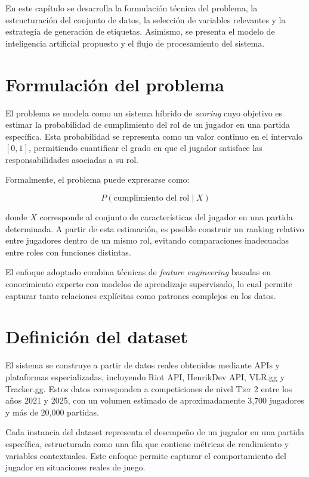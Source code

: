 \documentclass{ULBreport} %
\begin{document}
En este capítulo se desarrolla la formulación técnica del problema, la estructuración del conjunto de datos, la selección de variables relevantes y la estrategia de generación de etiquetas. Asimismo, se presenta el modelo de inteligencia artificial propuesto y el flujo de procesamiento del sistema.

\section{Formulación del problema}

El problema se modela como un sistema híbrido de \textit{scoring} cuyo objetivo es estimar la probabilidad de cumplimiento del rol de un jugador en una partida específica. Esta probabilidad se representa como un valor continuo en el intervalo $[0,1]$, permitiendo cuantificar el grado en que el jugador satisface las responsabilidades asociadas a su rol.

Formalmente, el problema puede expresarse como:

\[
P(\text{cumplimiento del rol} \mid X)
\]

donde $X$ corresponde al conjunto de características del jugador en una partida determinada. A partir de esta estimación, es posible construir un ranking relativo entre jugadores dentro de un mismo rol, evitando comparaciones inadecuadas entre roles con funciones distintas.

El enfoque adoptado combina técnicas de \textit{feature engineering} basadas en conocimiento experto con modelos de aprendizaje supervisado, lo cual permite capturar tanto relaciones explícitas como patrones complejos en los datos.

\section{Definición del dataset}

El sistema se construye a partir de datos reales obtenidos mediante APIs y plataformas especializadas, incluyendo Riot API, HenrikDev API, VLR.gg y Tracker.gg. Estos datos corresponden a competiciones de nivel Tier 2 entre los años 2021 y 2025, con un volumen estimado de aproximadamente 3,700 jugadores y más de 20,000 partidas.

Cada instancia del dataset representa el desempeño de un jugador en una partida específica, estructurada como una fila que contiene métricas de rendimiento y variables contextuales. Este enfoque permite capturar el comportamiento del jugador en situaciones reales de juego.
\end{document}
